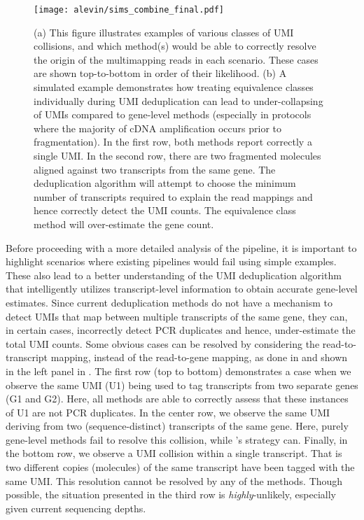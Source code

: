 \begin{figure*}[!htb]
  \texttt{[image: alevin/sims\_combine\_final.pdf]}
  \caption{(a) This figure illustrates examples of various classes of UMI collisions, and which method(s) would be able to correctly resolve 
  the origin of the multimapping reads in each scenario. These cases are shown top-to-bottom in order of their likelihood. (b) A simulated example demonstrates how treating equivalence classes individually during UMI deduplication can lead 
  to under-collapsing of UMIs compared to gene-level methods (especially in protocols where the majority of cDNA amplification occurs 
  prior to fragmentation). In the first row, both methods report correctly a single UMI. In the second row, there are two fragmented molecules aligned against two transcripts from the same gene. The \alevin deduplication algorithm will attempt to choose the minimum number of transcripts required to explain the read mappings and hence correctly detect the UMI counts. The equivalence class method will over-estimate the gene count.}
  \label{fig:collision_sim}
\end{figure*}

Before proceeding with a more detailed analysis of the \alevin pipeline, it is important to highlight scenarios where existing pipelines would fail using simple examples. These also lead to a better understanding of the \alevin UMI deduplication algorithm that intelligently utilizes transcript-level information to obtain accurate gene-level estimates. 
Since current deduplication methods do not have a mechanism to detect UMIs that map between multiple transcripts of the same gene, they can, in certain cases, incorrectly detect PCR duplicates and hence, under-estimate the total UMI counts. Some obvious cases can be resolved by considering the read-to-transcript mapping, instead of the read-to-gene mapping, as done in \alevin and shown in the left panel in .
The first row (top to bottom) demonstrates a case when we observe the same UMI (U1) being used to
tag transcripts from two separate genes (G1 and G2). Here, all methods are able to correctly assess that these instances of U1 are not 
PCR duplicates. In the center row, we observe the same UMI deriving from two (sequence-distinct) transcripts of the same gene. Here,
purely gene-level methods fail to resolve this collision, while \alevin's strategy can. Finally, in the bottom row, we observe a UMI 
collision within a single transcript. That is two different copies (molecules) of the same transcript have been tagged with the same UMI. 
This resolution cannot be resolved by any of the methods.  Though possible, the situation presented in the
third row is \emph{highly}-unlikely, especially given current sequencing depths.

